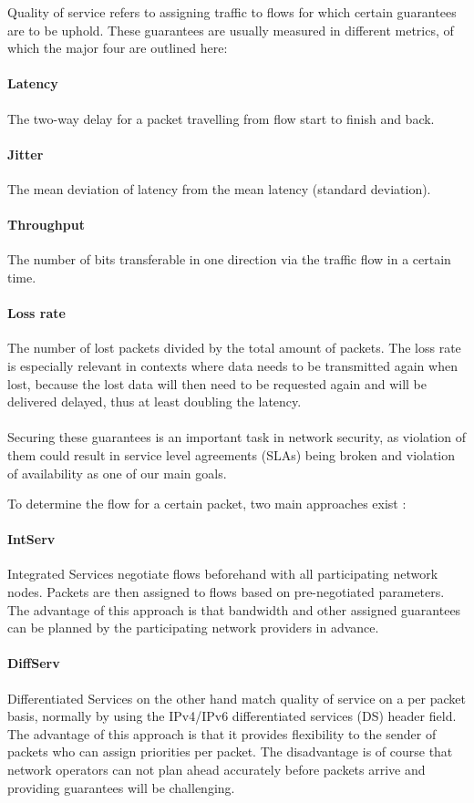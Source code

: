 Quality of service \cite{qos, rfc791} refers to assigning traffic to flows for which certain guarantees are to be uphold. These guarantees are usually measured in different metrics, of which the major four are outlined here:
\paragraph{Latency} The two-way delay for a packet travelling from flow start to finish and back.
\paragraph{Jitter} The mean deviation of latency from the mean latency (standard deviation).
\paragraph{Throughput} The number of bits transferable in one direction via the traffic flow in a certain time.
\paragraph{Loss rate} The number of lost packets divided by the total amount of packets. The loss rate is especially relevant in contexts where data needs to be transmitted again when lost, because the lost data will then need to be requested again and will be delivered delayed, thus at least doubling the latency.

\paragraph{}Securing these guarantees is an important task in network security, as violation of them could result in service level agreements (SLAs) being broken and violation of availability as one of our main goals.

To determine the flow for a certain packet, two main approaches exist \cite{serv}:
\paragraph{IntServ} Integrated Services \cite{rfc1633} negotiate flows beforehand with all participating network nodes. Packets are then assigned to flows based on pre-negotiated parameters. The advantage of this approach is that bandwidth and other assigned guarantees can be planned by the participating network providers in advance.
\paragraph{DiffServ} Differentiated Services \cite{rfc2474} on the other hand match quality of service on a per packet basis, normally by using the IPv4/IPv6 differentiated services (DS) header field. The advantage of this approach is that it provides flexibility to the sender of packets who can assign priorities per packet. The disadvantage is of course that network operators can not plan ahead accurately before packets arrive and providing guarantees will be challenging.

